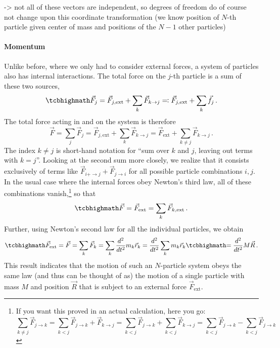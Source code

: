 \documentclass[../class_mech_main.tex]{subfiles}
\begin{document}
-> not all of these vectors are independent, so degrees of freedom do of course not change upon this coordinate transformation (we know position of $N$-th particle given center of mass and positions of the $N-1$ other particles)



			\paragraph{Momentum}
Unlike before, where we only had to consider external forces, a system of particles also has internal interactions. The total force on the $j$-th particle is a sum of these two sources,
\begin{equation}
	\eqbox{
		\vec{F}_j = \vec{F}_{j, \mathrm{ext}} + \sum_k \vec{F}_{k \rightarrow j} \eqqcolon \vec{F}_{j, \mathrm{ext}} + \sum_k \vec{f}_j
	} \, .
\end{equation}
The total force acting in and on the system is therefore
\begin{equation}
	\vec{F} = \sum_j \vec{F}_j = \vec{F}_{j, \mathrm{ext}} + \sum_k \vec{F}_{k \rightarrow j} = \vec{F}_\mathrm{ext} + \sum_{k \neq j} \vec{F}_{k \rightarrow j} \, .
\end{equation}
The index $k \neq j$ is short-hand notation for \enquote{sum over $k$ and $j$, leaving out terms with $k = j$}. Looking at the second sum more closely, we realize that it consists exclusively of terms like $\vec{F}_{i + \rightarrow j} + \vec{F}_{j \rightarrow i}$ for all possible particle combinations $i, j$. In the usual case where the internal forces obey Newton's third law, all of these combinations vanish,\footnote{If you want this proved in an actual calculation, here you go:
\begin{equation}
	\sum_{k \neq j} \vec{F}_{j \rightarrow k} = \sum_{k < j} \vec{F}_{j \rightarrow k} + \vec{F}_{k \rightarrow j} = \sum_{k < j} \vec{F}_{j \rightarrow k} + \sum_{k < j} \vec{F}_{k \rightarrow j} = \sum_{k < j} \vec{F}_{j \rightarrow k} - \sum_{k < j} \vec{F}_{j \rightarrow k}
\end{equation}%
} so that
\begin{equation}
	\eqbox{
		\vec{F} = \vec{F}_\mathrm{ext} = \sum_k \vec{F}_{k, \mathrm{ext}}
	} \, .
\end{equation}
Further, using Newton's second law for all the individual particles, we obtain
\begin{equation}
	\eqbox{
		\vec{F}_\mathrm{ext}
	} = \vec{F} = \sum_k \vec{F}_k = \sum_k \dv[2]{t} m_k \vec{r}_k = \dv[2]{t} \sum_k m_k \vec{r}_k
	\eqbox{
		= \dv[2]{t} M \vec{R}
	} \, .
\end{equation}
This result indicates that the motion of such an $N$-particle system obeys the same law (and thus can be thought of as) the motion of a single particle with mass $M$ and position $\vec{R}$ that is subject to an external force $\vec{F}_\mathrm{ext}$.
\end{document}
